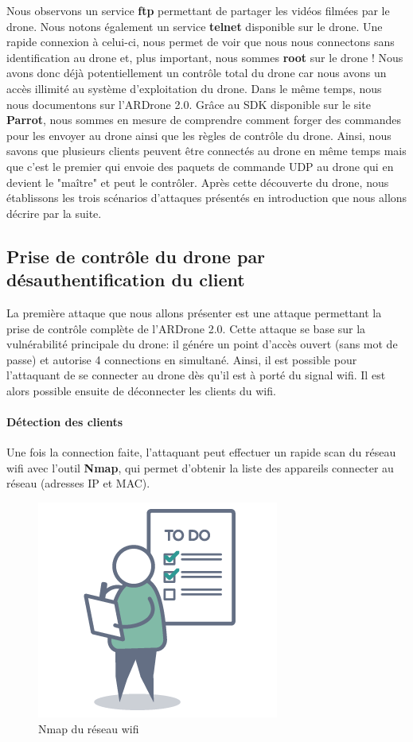 Nous observons un service \textbf{ftp} permettant de partager les vidéos filmées par le drone. Nous notons également un service \textbf{telnet} disponible sur le drone. Une rapide connexion à celui-ci, nous permet de voir que nous nous connectons sans identification au drone et, plus important, nous sommes \textbf{root} sur le drone ! Nous avons donc déjà potentiellement un contrôle total du drone car nous avons un accès illimité au système d'exploitation du drone.
\newline
Dans le même temps, nous nous documentons sur l'ARDrone 2.0. Grâce au SDK disponible sur le site \textbf{Parrot}, nous sommes en mesure de comprendre comment forger des commandes pour les envoyer au drone ainsi que les règles de contrôle du drone. Ainsi, nous savons que plusieurs clients peuvent être connectés au drone en même temps mais que c'est le premier qui envoie des paquets de commande UDP au drone qui en devient le "maître" et peut le contrôler.
\newline Après cette découverte du drone, nous établissons les trois scénarios d'attaques présentés en introduction que nous allons décrire par la suite.

\subsection{Prise de contrôle du drone par désauthentification du client}
La première attaque que nous allons présenter est une attaque permettant la prise de contrôle complète de l'ARDrone 2.0. Cette attaque se base sur la vulnérabilité principale du drone: il génére un point d'accès ouvert (sans mot de passe) et autorise 4 connections en simultané. Ainsi, il est possible pour l'attaquant de se connecter au drone dès qu'il est à porté du signal wifi. Il est alors possible ensuite de déconnecter les clients du wifi.
\paragraph{Détection des clients}
Une fois la connection faite, l'attaquant peut effectuer un rapide scan du réseau wifi avec l'outil \textbf{Nmap}, qui permet d'obtenir la liste des appareils connecter au réseau (adresses IP et MAC).

\begin{figure}[H]
  \centering
  \includegraphics[scale=0.3]{images/todo.png}
  \caption{Nmap du réseau wifi}
\end{figure}

